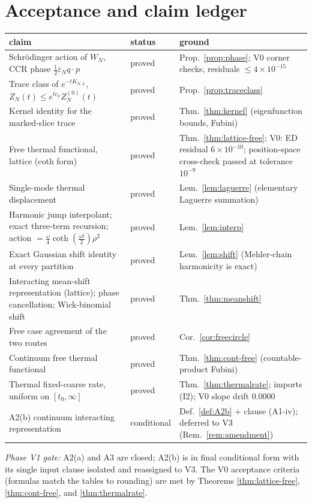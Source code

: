 \documentclass[11pt,a4paper]{article}
\theoremstyle{plain}
\theoremstyle{definition}
\newcommand{\eps}{\varepsilon}
\DeclareMathOperator{\cth}{coth}
\begin{document}
\section{Acceptance and claim ledger}\label{sec:ledger}

\begin{longtable}{P{5.6cm}P{2.6cm}P{5.6cm}}
\toprule
claim & status & ground \\
\midrule
\endhead
Schr\"odinger action of $W_N$, CCR phase $\tfrac12\eps_Nq\cdot p$ &
proved & Prop.~\ref{prop:phase}; V0 corner checks, residuals
$\le4\times10^{-15}$ \\
Trace class of $e^{-tK_{N,L}}$, $Z_N(t)\le e^{tc_V}Z^{(0)}_N(t)$ &
proved & Prop.~\ref{prop:traceclass} \\
Kernel identity for the marked-slice trace &
proved & Thm.~\ref{thm:kernel} (eigenfunction bounds, Fubini) \\
Free thermal functional, lattice (coth form) &
proved & Thm.~\ref{thm:lattice-free}; V0: ED residual $6\times10^{-10}$;
position-space cross-check passed at tolerance $10^{-9}$ \\
Single-mode thermal displacement &
proved & Lem.~\ref{lem:laguerre} (elementary Laguerre summation) \\
Harmonic jump interpolant; exact three-term recursion; action
$=\tfrac\omega4\cth(\tfrac{\omega t}2)\rho^2$ &
proved & Lem.~\ref{lem:interp} \\
Exact Gaussian shift identity at every partition &
proved & Lem.~\ref{lem:shift} (Mehler-chain harmonicity is exact) \\
Interacting mean-shift representation (lattice); phase cancellation;
Wick-binomial shift &
proved & Thm.~\ref{thm:meanshift} \\
Free case agreement of the two routes &
proved & Cor.~\ref{cor:freecircle} \\
Continuum free thermal functional &
proved & Thm.~\ref{thm:cont-free} (countable-product Fubini) \\
Thermal fixed-coarse rate, uniform on $[t_0,\infty]$ &
proved & Thm.~\ref{thm:thermalrate}; imports (I2); V0 slope drift $0.0000$ \\
A2(b) continuum interacting representation &
conditional & Def.~\ref{def:A2b} $+$ clause (A1-iv); deferred to V3
(Rem.~\ref{rem:amendment}) \\
\bottomrule
\end{longtable}

\noindent\emph{Phase V1 gate:} A2(a) and A3 are closed; A2(b) is in final
conditional form with its single input clause isolated and reassigned to V3.
The V0 acceptance criteria (formulas match the tables to rounding) are met by
Theorems \ref{thm:lattice-free}, \ref{thm:cont-free},
and \ref{thm:thermalrate}.
\end{document}
